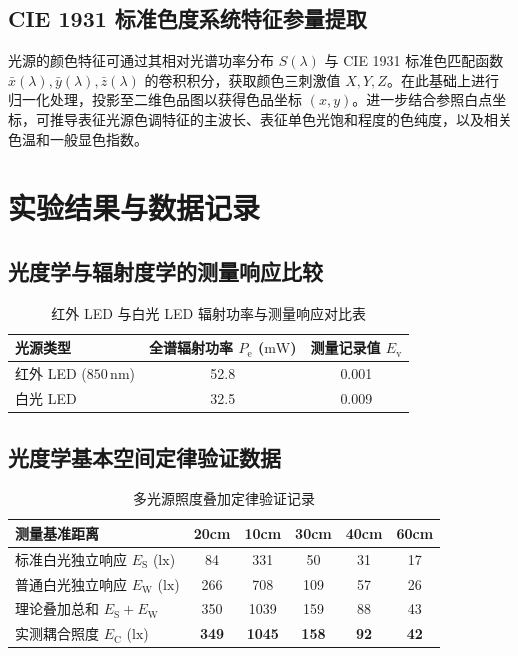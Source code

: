 \documentclass[12pt, a4paper]{article}
\begin{document}
\subsection{CIE 1931 标准色度系统特征参量提取}
光源的颜色特征可通过其相对光谱功率分布 $S(\lambda)$ 与 CIE 1931 标准色匹配函数 $\bar{x}(\lambda), \bar{y}(\lambda), \bar{z}(\lambda)$ 的卷积积分，获取颜色三刺激值 $X, Y, Z$。在此基础上进行归一化处理，投影至二维色品图以获得色品坐标 $(x, y)$。进一步结合参照白点坐标，可推导表征光源色调特征的主波长、表征单色光饱和程度的色纯度，以及相关色温和一般显色指数。


\newpage %
\section{实验结果与数据记录}

\subsection{光度学与辐射度学的测量响应比较}
\begin{table}[H]
    \centering
    \caption{红外 LED 与白光 LED 辐射功率与测量响应对比表}
    \begin{tabular}{lcc}
        \toprule
        \textbf{光源类型} & \textbf{全谱辐射功率 $P_{\mathrm{e}}$ ($\mathrm{mW}$)} & \textbf{测量记录值 $E_{\mathrm{v}}$} \\ 
        \midrule
        红外 LED ($850\,\mathrm{nm}$) & 52.8 & 0.001 \\ 
        白光 LED & 32.5 & 0.009 \\ 
        \bottomrule
    \end{tabular}
\end{table}

\subsection{光度学基本空间定律验证数据}

\begin{table}[H]
    \centering
    \caption{多光源照度叠加定律验证记录}
    \begin{tabular}{lccccc}
        \toprule
        \textbf{测量基准距离} & \textbf{20cm} & \textbf{10cm} & \textbf{30cm} & \textbf{40cm} & \textbf{60cm} \\ 
        \midrule
        标准白光独立响应 $E_{\mathrm{S}}$ ($\mathrm{lx}$) & 84  & 331  & 50  & 31 & 17 \\ 
        普通白光独立响应 $E_{\mathrm{W}}$ ($\mathrm{lx}$) & 266 & 708  & 109 & 57 & 26 \\ 
        理论叠加总和 $E_{\mathrm{S}} + E_{\mathrm{W}}$ & 350 & 1039 & 159 & 88 & 43 \\ 
        实测耦合照度 $E_{\mathrm{C}}$ ($\mathrm{lx}$) & \textbf{349} & \textbf{1045} & \textbf{158} & \textbf{92} & \textbf{42} \\ 
        \bottomrule
    \end{tabular}
\end{table}
\end{document}

